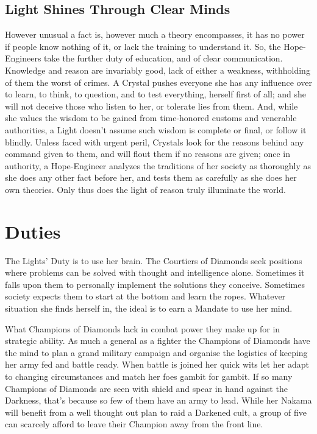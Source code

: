 \subsection*{Light Shines Through Clear Minds}
However unusual a fact is, however much a theory encompasses, it has no power if people know nothing of it, or lack the training to understand it. So, the Hope-Engineers take the further duty of education, and of clear communication. Knowledge and reason are invariably good, lack of either a weakness, withholding of them the worst of crimes. A Crystal pushes everyone she has any influence over to learn, to think, to question, and to test everything, herself first of all; and she will not deceive those who listen to her, or tolerate lies from them. And, while she values the wisdom to be gained from time-honored customs and venerable authorities, a Light doesn't assume such wisdom is complete or final, or follow it blindly. Unless faced with urgent peril, Crystals look for the reasons behind any command given to them, and will flout them if no reasons are given; once in authority, a Hope-Engineer analyzes the traditions of her society as thoroughly as she does any other fact before her, and tests them as 
carefully as she does her own theories. Only thus does the light of reason truly illuminate the world.
\section*{Duties}
The Lights' Duty is to use her brain. The Courtiers of Diamonds seek positions where problems can be solved with thought and intelligence alone. Sometimes it falls upon them to personally implement the solutions they conceive. Sometimes society expects them to start at the bottom and learn the ropes. Whatever situation she finds herself in, the ideal is to earn a Mandate to use her mind.

What Champions of Diamonds lack in combat power they make up for in strategic ability. As much a general as a fighter the Champions of Diamonds have the mind to plan a grand military campaign and organise the logistics of keeping her army fed and battle ready. When battle is joined her quick wits let her adapt to changing circumstances and match her foes gambit for gambit. If so many Champions of Diamonds are seen with shield and spear in hand against the Darkness, that's because so few of them have an army to lead. While her Nakama will benefit from a well thought out plan to raid a Darkened cult, a group of five can scarcely afford to leave their Champion away from the front line.

